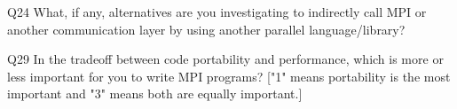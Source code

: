 \begin{description}%
\item{Q24} What, if any, alternatives are you investigating to indirectly call MPI or another communication layer by using another parallel language/library?%
\item{Q29} In the tradeoff between code portability and performance, which is more or less important for you to write MPI programs? ["1" means portability is the most important and "3" means both are equally important.]%
\end{description}%
